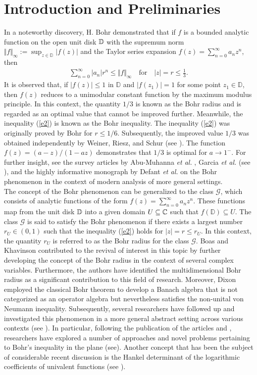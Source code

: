 \documentclass[11pt,reqno]{amsart}
\newtheorem{open problem}{Open problem}[section]
\newcommand{\G}{{\mathcal{G}}}
\newcommand{\D}{{\Bbb{D}}}
\newcommand{\C}{{\Bbb{C}}}
\newcommand{\bea}{\begin{eqnarray}}
\newcommand{\eea}{\end{eqnarray}}
\numberwithin{equation}{section}
\begin{document}
\section{Introduction and Preliminaries}
In a noteworthy discovery, H. Bohr \cite{B1914} demonstrated that if $f$ is a bounded analytic function on the open unit disk $\D$ with the supremum norm 
$\Vert f\Vert_\infty:=\sup_{z\in\mathbb{D}} |f(z)|$ and the Taylor series expansion $f(z)=\sum_{n=0}^{\infty} a_nz^n$, then 
\bea\label{e2} \sum_{n=0}^{\infty}|a_n|r^n\leq \Vert f\Vert_\infty\quad\text{for}\quad|z|=r\leq\frac{1}{3}.\eea
It is observed that, if $|f(z)|\leq 1$ in $\mathbb{D}$ and $|f(z_1)|=1$ for some point $z_1\in\mathbb{D}$, then $f(z)$ reduces to a unimodular constant function by the maximum 
modulus principle. In this context, the quantity $1/3$ is known as the Bohr radius and is regarded as an optimal value that cannot be improved further. Meanwhile, the inequality 
(\ref{e2}) is known as the Bohr inequality. 
The inequality (\ref{e2}) was originally proved by Bohr \cite{B1914} for $r\leq 1/6$. Subsequently, the improved value $1/3$ was obtained independently by Weiner, Riesz, and Schur (see \cite{D1995}).
The function $f(z)=(a-z)/(1-az)$ demonstrates that $1/3$ is optimal for $a\to1^-$. 
For further insight, see the survey articles by Abu-Muhanna {\it et al.} \cite{AAP2017}, Garcia {\it et al.} (see \cite[Chapter 8]{GMR2018}), and the highly informative monograph by Defant {\it et al.} \cite{DGMS2019} on the Bohr phenomenon in the context of modern analysis of more general settings.\\[2mm]
\indent 
The concept of the Bohr phenomenon can be generalized to the class $\G$, which consists of analytic functions of the form $f(z)=\sum_{n=0}^{\infty} a_nz^n$.
These functions map from the unit disk $\D$ into a given domain $U\subseteq\C$ such that $f(\mathbb{D})\subseteq U$.
The class $\G$ is said to satisfy the Bohr phenomenon if there exists a largest number $ r_{U}\in(0, 1)$ such that the inequality (\ref{e2}) holds for $|z|= r \leq r_{U}$.
In this context, the quantity $r_U$ is referred to as the Bohr radius for the class $\G$. 
Boas and Khavinson \cite{BK1997} contributed to the revival of interest in this topic by further developing the concept of the Bohr radius in the context of several complex variables.
Furthermore, the authors have identified the multidimensional Bohr radius as a significant contribution to this field of research. 
Moreover, Dixon \cite{D1995} employed the classical Bohr theorem to develop a Banach algebra that is not categorized as an operator algebra but nevertheless satisfies the 
non-unital von Neumann inequality. Subsequently, several researchers have followed up and investigated this phenomenon in a more general abstract setting across various contexts 
(see \cite{1A2000,2A2001, BDK2004,LP2021,PS2004,1AH2022}). 
In particular, following the publication of the articles \cite{AAP2017} and \cite{2KP2018}, researchers have explored a number of approaches and novel problems pertaining to Bohr's inequality in the plane (see\cite{AAH2022,AKP2019,1AH2021,2AH2021,AA2023,BB2004,BB2004,DFOOS2011,1KP2018,LP2023,MBG2024}).
Another concept that has been the subject of considerable recent discussion is the Hankel determinant of the logarithmic coefficients of univalent functions  (see \cite{AAS2023,B2024,MRA2024}).
\end{document}
